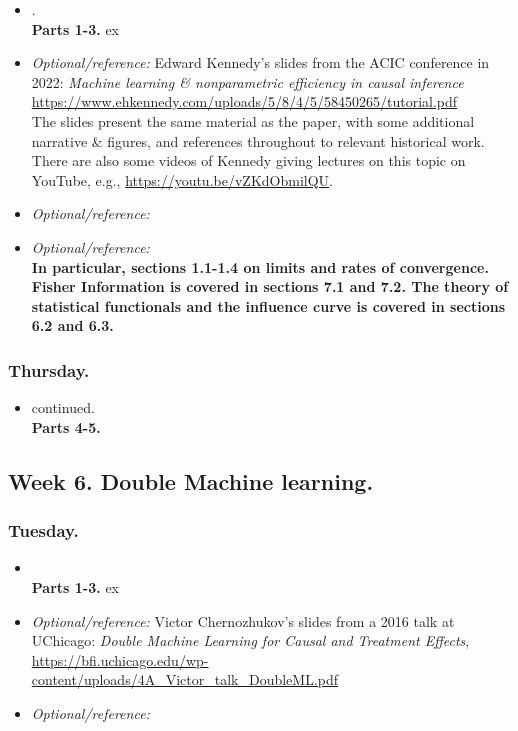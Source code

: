 \documentclass[letterpaper, 12pt, parskip=full,DIV=10]{scrartcl}
\begin{document}
\begin{itemize}
\item {}. \\
\textbf{Parts 1-3.} ex
\item  \textit{Optional/reference:} Edward Kennedy's slides from the ACIC conference in 2022: \emph{Machine learning \& nonparametric efficiency
in causal inference} \url{https://www.ehkennedy.com/uploads/5/8/4/5/58450265/tutorial.pdf}\\
The slides present the same material as the paper, with some additional narrative \& figures, and references throughout to relevant historical work. There are also some videos of Kennedy giving lectures on this topic on YouTube, e.g., \url{https://youtu.be/vZKdObmilQU}. 
\item  \textit{Optional/reference:} 
\item  \textit{Optional/reference:} \\
\textbf{In particular, sections 1.1-1.4 on limits and rates of convergence. Fisher Information is covered in sections 7.1 and 7.2. The theory of statistical functionals and the influence curve is covered in sections 6.2 and 6.3.}
\end{itemize}

\subsubsection*{Thursday.}
\begin{itemize}
\item \cite{kennedy2022semiparametric} continued. \\
\textbf{Parts 4-5.}
\end{itemize}

\subsection*{Week 6. Double Machine learning.}

\subsubsection*{Tuesday.}
\begin{itemize}
\item {} \\
\textbf{Parts 1-3.} ex
\item  \textit{Optional/reference:} Victor Chernozhukov's slides from a 2016 talk at UChicago: \emph{Double Machine Learning for Causal and Treatment Effects}, \url{https://bfi.uchicago.edu/wp-content/uploads/4A_Victor_talk_DoubleML.pdf}
\item  \textit{Optional/reference:} 
\end{itemize}
\end{document}
